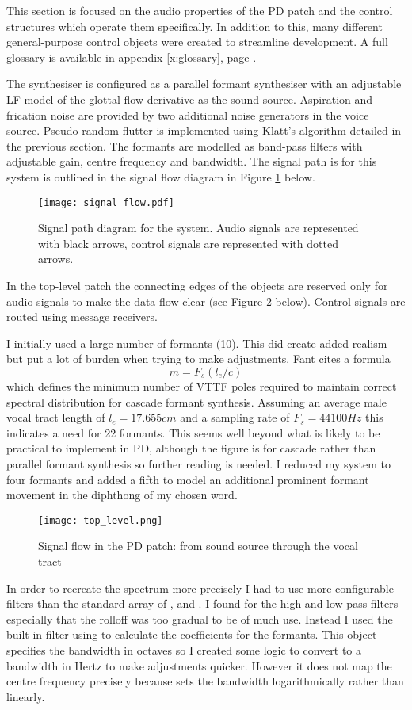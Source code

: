 This section is focused on the audio properties of the PD patch and the control structures which operate them specifically. In addition to this, many different general-purpose control objects were created to streamline development. A full glossary is available in appendix \ref{x:glossary}, page \pageref{x:glossary}.

The synthesiser is configured as a parallel formant synthesiser with an adjustable LF-model of the glottal flow derivative as the sound source. Aspiration and frication noise are provided by two additional noise generators in the voice source. Pseudo-random flutter is implemented using Klatt's algorithm detailed in the previous section. The formants are modelled as band-pass filters with adjustable gain, centre frequency and bandwidth. The signal path is for this system is outlined in the signal flow diagram in Figure \ref{fig:signal_path} below.
%
\begin{figure}[H]
	\texttt{[image: signal\_flow.pdf]}
	\caption{Signal path diagram for the system. Audio signals are represented with black arrows, control signals are represented with dotted arrows.}
	\label{fig:signal_path}
\end{figure}
%
In the top-level patch the connecting edges of the objects are reserved only for audio signals to make the data flow clear (see Figure \ref{fig:top_level} below). Control signals are routed using message receivers.

I initially used a large number of formants (10). This did create added realism but put a lot of burden when trying to make adjustments. Fant \cite{Fant1995} cites a formula
%
\begin{equation}
	m = F_s(l_e / c)
\end{equation}
%
which defines the minimum number of VTTF poles required to maintain correct spectral distribution for cascade formant synthesis. Assuming an average male vocal tract length of $l_e=17.65\si{5cm}$ and a sampling rate of $F_s = \si{44100Hz}$ this indicates a need for 22 formants. This seems well beyond what is likely to be practical to implement in PD, although the figure is for cascade rather than parallel formant synthesis so further reading is needed. I reduced my system to four formants and added a fifth to model an additional prominent formant movement in the diphthong of my chosen word.
%
\begin{figure}[H]
	\texttt{[image: top\_level.png]}
	\caption{Signal flow in the PD patch: from sound source through the vocal tract}
	\label{fig:top_level}
\end{figure}
%
In order to recreate the spectrum more precisely I had to use more configurable filters than the standard array of ,  and . I found for the high and low-pass filters especially that the rolloff was too gradual to be of much use. Instead I used the built-in  filter using  to calculate the coefficients for the formants. This object specifies the bandwidth in octaves so I created some logic to convert to a bandwidth in Hertz to make adjustments quicker. However it does not map the centre frequency precisely because  sets the bandwidth logarithmically rather than linearly. 

